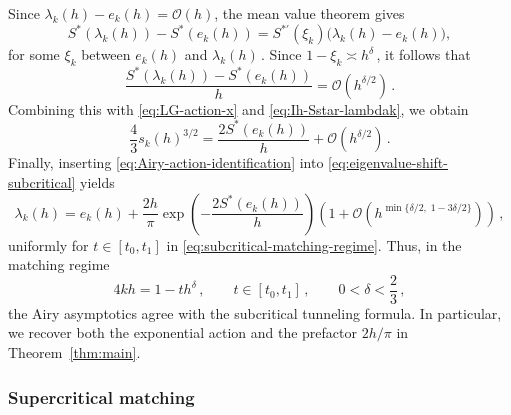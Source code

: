 \documentclass[11pt]{amsart}
\numberwithin{equation}{section}
\theoremstyle{remark}
\begin{document}
Since $\lambda_k(h)-e_k(h)=\mathcal O(h)$, the mean value theorem gives
\[
S^*(\lambda_k(h))-S^*(e_k(h))
=
S^{*\prime}(\xi_k)
\bigl(\lambda_k(h)-e_k(h)\bigr),
\]
for some $\xi_k$ between $e_k(h)$ and $\lambda_k(h)\,$. Since
$1-\xi_k\asymp h^\delta\,$, it follows that
\[
\frac{S^*(\lambda_k(h))-S^*(e_k(h))}{h}
=
\mathcal O(h^{\delta/2})\,.
\]
Combining this with \eqref{eq:LG-action-x} and
\eqref{eq:Ih-Sstar-lambdak}, we obtain
\begin{equation}\label{eq:Airy-action-identification}
	\frac43s_k(h)^{3/2}
	=
	\frac{2S^*(e_k(h))}{h}
	+
	\mathcal O(h^{\delta/2})\,.
\end{equation}
Finally, inserting \eqref{eq:Airy-action-identification} into
\eqref{eq:eigenvalue-shift-subcritical} yields
\begin{equation}\label{eq:subcritical-matching-final}
	\lambda_k(h)
	=
	e_k(h)
	+
	\frac{2h}{\pi}
	\exp\left(-\frac{2S^*(e_k(h))}{h}\right)
	\left(
	1+
	\mathcal O\left(
	h^{\min\{\delta/2,\;1-3\delta/2\}}
	\right)
	\right)\,,
\end{equation}
uniformly for $t\in[t_0,t_1]$ in
\eqref{eq:subcritical-matching-regime}. Thus, in the matching regime
\[
4kh=1-th^\delta\,,
\qquad
t\in[t_0,t_1]\,,
\qquad
0<\delta<\frac23\,,
\]
the Airy asymptotics agree with the subcritical tunneling formula.
In particular, we recover both the exponential action and the
prefactor $2h/\pi$ in Theorem~\ref{thm:main}.


\subsubsection{Supercritical matching}
\end{document}
